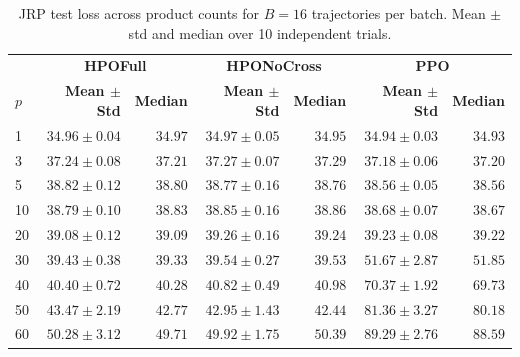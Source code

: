 \documentclass{article}
\theoremstyle{definition}
\theoremstyle{remark}
\begin{document}
\begin{table}[ht]
  \centering
  \small
  \caption{JRP test loss across product counts for $B=16$ trajectories per batch. Mean $\pm$ std and median over 10 independent trials.}
  \label{tab:jrp-results-16}
  \begin{tabular}{lrrrrrr}
    \toprule
     & \multicolumn{2}{c}{\textbf{HPOFull}} & \multicolumn{2}{c}{\textbf{HPONoCross}} & \multicolumn{2}{c}{\textbf{PPO}} \\
    \cmidrule(lr){2-3} \cmidrule(lr){4-5} \cmidrule(lr){6-7}
    \textbf{$p$} & \textbf{Mean $\pm$ Std} & \textbf{Median} & \textbf{Mean $\pm$ Std} & \textbf{Median} & \textbf{Mean $\pm$ Std} & \textbf{Median} \\
    \midrule
    1 & $34.96 \pm 0.04$ & $34.97$ & $34.97 \pm 0.05$ & $34.95$ & $34.94 \pm 0.03$ & $34.93$ \\
    3 & $37.24 \pm 0.08$ & $37.21$ & $37.27 \pm 0.07$ & $37.29$ & $37.18 \pm 0.06$ & $37.20$ \\
    5 & $38.82 \pm 0.12$ & $38.80$ & $38.77 \pm 0.16$ & $38.76$ & $38.56 \pm 0.05$ & $38.56$ \\
    10 & $38.79 \pm 0.10$ & $38.83$ & $38.85 \pm 0.16$ & $38.86$ & $38.68 \pm 0.07$ & $38.67$ \\
    20 & $39.08 \pm 0.12$ & $39.09$ & $39.26 \pm 0.16$ & $39.24$ & $39.23 \pm 0.08$ & $39.22$ \\
    30 & $39.43 \pm 0.38$ & $39.33$ & $39.54 \pm 0.27$ & $39.53$ & $51.67 \pm 2.87$ & $51.85$ \\
    40 & $40.40 \pm 0.72$ & $40.28$ & $40.82 \pm 0.49$ & $40.98$ & $70.37 \pm 1.92$ & $69.73$ \\
    50 & $43.47 \pm 2.19$ & $42.77$ & $42.95 \pm 1.43$ & $42.44$ & $81.36 \pm 3.27$ & $80.18$ \\
    60 & $50.28 \pm 3.12$ & $49.71$ & $49.92 \pm 1.75$ & $50.39$ & $89.29 \pm 2.76$ & $88.59$ \\
    \bottomrule
  \end{tabular}
\end{table}
\end{document}
